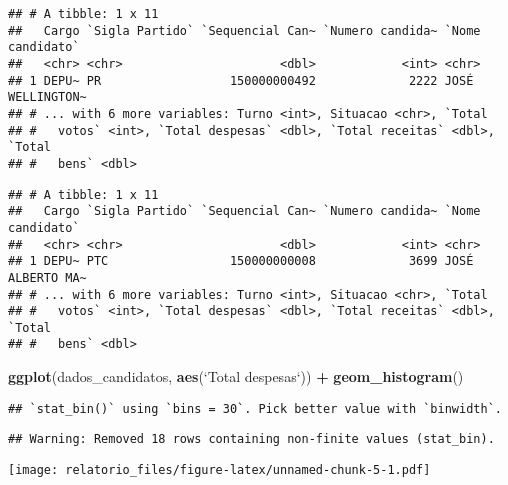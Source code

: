 \documentclass[]{article}
\newenvironment{Shaded}{\begin{snugshade}}{\end{snugshade}}
\newcommand{\KeywordTok}[1]{\textcolor[rgb]{0.13,0.29,0.53}{\textbf{#1}}}
\newcommand{\DataTypeTok}[1]{\textcolor[rgb]{0.13,0.29,0.53}{#1}}
\newcommand{\DecValTok}[1]{\textcolor[rgb]{0.00,0.00,0.81}{#1}}
\newcommand{\StringTok}[1]{\textcolor[rgb]{0.31,0.60,0.02}{#1}}
\newcommand{\OperatorTok}[1]{\textcolor[rgb]{0.81,0.36,0.00}{\textbf{#1}}}
\newcommand{\NormalTok}[1]{#1}
\begin{document}
\begin{verbatim}
## # A tibble: 1 x 11
##   Cargo `Sigla Partido` `Sequencial Can~ `Numero candida~ `Nome candidato`
##   <chr> <chr>                      <dbl>            <int> <chr>           
## 1 DEPU~ PR                  150000000492             2222 JOSÉ WELLINGTON~
## # ... with 6 more variables: Turno <int>, Situacao <chr>, `Total
## #   votos` <int>, `Total despesas` <dbl>, `Total receitas` <dbl>, `Total
## #   bens` <dbl>
\end{verbatim}

\begin{Shaded}
\end{Shaded}

\begin{verbatim}
## # A tibble: 1 x 11
##   Cargo `Sigla Partido` `Sequencial Can~ `Numero candida~ `Nome candidato`
##   <chr> <chr>                      <dbl>            <int> <chr>           
## 1 DEPU~ PTC                 150000000008             3699 JOSÉ ALBERTO MA~
## # ... with 6 more variables: Turno <int>, Situacao <chr>, `Total
## #   votos` <int>, `Total despesas` <dbl>, `Total receitas` <dbl>, `Total
## #   bens` <dbl>
\end{verbatim}

\begin{Shaded}
\begin{Highlighting}[]
\KeywordTok{ggplot}\NormalTok{(dados_candidatos, }\KeywordTok{aes}\NormalTok{(}\StringTok{`}\DataTypeTok{Total despesas}\StringTok{`}\NormalTok{)) }\OperatorTok{+}
\KeywordTok{geom_histogram}\NormalTok{()}
\end{Highlighting}
\end{Shaded}

\begin{verbatim}
## `stat_bin()` using `bins = 30`. Pick better value with `binwidth`.
\end{verbatim}

\begin{verbatim}
## Warning: Removed 18 rows containing non-finite values (stat_bin).
\end{verbatim}

\texttt{[image: relatorio\_files/figure-latex/unnamed-chunk-5-1.pdf]}
\end{document}
